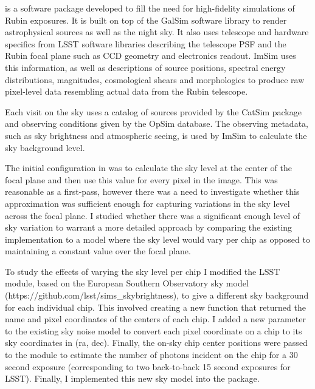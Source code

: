  is a software package developed to fill the need for high-fidelity simulations of Rubin exposures. It is built on top of the GalSim software library to render astrophysical sources as well as the night sky. It also uses telescope and hardware specifics from LSST software libraries describing the telescope PSF and the Rubin focal plane such as CCD geometry and electronics readout. ImSim uses this information, as well as descriptions of source positions, spectral energy distributions, magnitudes, cosmological shears and morphologies to produce raw pixel-level data resembling actual data from the Rubin telescope.


Each visit on the sky uses a catalog of sources provided by the CatSim package and observing conditions given by the OpSim database. The observing metadata, such as sky brightness and atmospheric seeing, is used by ImSim to calculate the sky background level. 

The initial configuration in  was to calculate the sky level at the center of the focal plane and then use this value for every pixel in the image. This was reasonable as a first-pass, however there was a need to investigate whether this approximation was sufficient enough for capturing variations in the sky level across the focal plane. I studied whether there was a significant enough level of sky variation to warrant a more detailed approach by comparing the existing implementation to a model where the sky level would vary per chip as opposed to maintaining a constant value over the focal plane.

To study the effects of varying the sky level per chip I modified the LSST  module, based on the European Southern Observatory sky model (https://github.com/lsst/sims_skybrightness), to give a different sky background for each individual chip. This involved creating a new function that returned the name and pixel coordinates of the centers of each chip. I added a new  parameter to the existing sky noise model to convert each pixel coordinate on a chip to its sky coordinates in (ra, dec). Finally, the on-sky chip center positions were passed to the  module to estimate the number of photons incident on the chip for a 30 second exposure (corresponding to two back-to-back 15 second exposures for LSST). Finally, I implemented this new sky model into the  package.

